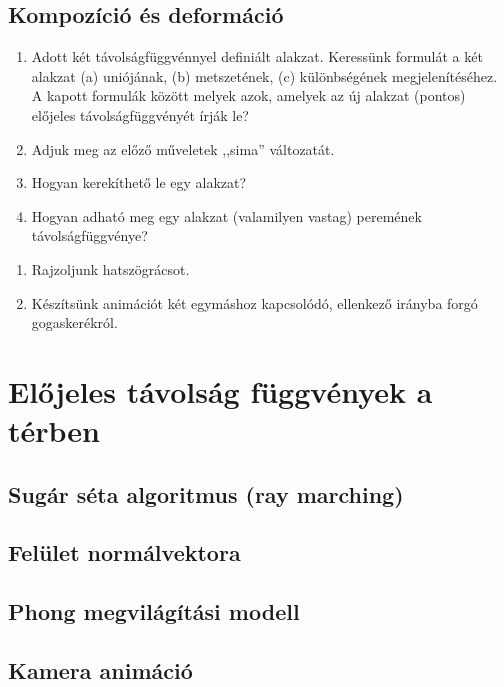 \subsection{Kompozíció és deformáció}

\matfeladatok

\begin{enumerate}

\item Adott két távolságfüggvénnyel definiált alakzat. Keressünk formulát a
két alakzat
(a) uniójának,
(b) metszetének,
(c) különbségének megjelenítéséhez. A kapott formulák között melyek azok, amelyek
az új alakzat (pontos) előjeles távolságfüggvényét írják le?

\item Adjuk meg az előző műveletek ,,sima'' változatát.

\item Hogyan kerekíthető le egy alakzat?

\item Hogyan adható meg egy alakzat (valamilyen vastag) peremének távolságfüggvénye?
\end{enumerate}


\progfeladatok
\begin{enumerate}
  \item Rajzoljunk hatszögrácsot.
  \item Készítsünk animációt két egymáshoz kapcsolódó, ellenkező irányba forgó gogaskerékról.

\end{enumerate}

\section{Előjeles távolság függvények a térben}

\subsection{Sugár séta algoritmus (ray marching)}


\subsection{Felület normálvektora}


\subsection{Phong megvilágítási modell}

\subsection{Kamera animáció}




